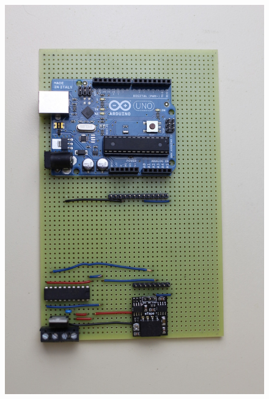 \begin{figure}[h]
\centering
\includegraphics[angle=90, scale=0.4]{figures/shield_picture_resized.jpeg}
\end{figure}
